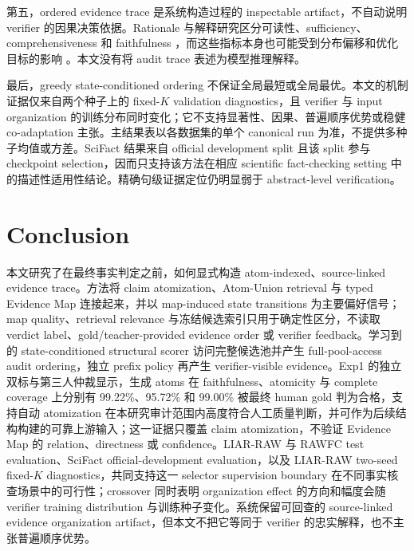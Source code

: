\documentclass[letterpaper]{article}
\begin{document}
第五，ordered evidence trace 是系统构造过程的 inspectable artifact，不自动说明 verifier 的因果决策依据。Rationale 与解释研究区分可读性、sufficiency、comprehensiveness 和 faithfulness \citep{Lei2016Rationalizing,DeYoung2020ERASER,Jacovi2020Faithfulness}，而这些指标本身也可能受到分布偏移和优化目标的影响 \citep{Hsia2024Goodhart}。本文没有将 audit trace 表述为模型推理解释。

最后，greedy state-conditioned ordering 不保证全局最短或全局最优。本文的机制证据仅来自两个种子上的 fixed-$K$ validation diagnostics，且 verifier 与 input organization 的训练分布同时变化；它不支持显著性、因果、普遍顺序优势或稳健 co-adaptation 主张。主结果表以各数据集的单个 canonical run 为准，不提供多种子均值或方差。SciFact 结果来自 official development split 且该 split 参与 checkpoint selection，因而只支持该方法在相应 scientific fact-checking setting 中的描述性适用性结论。精确句级证据定位仍明显弱于 abstract-level verification。

\section{Conclusion}

本文研究了在最终事实判定之前，如何显式构造 atom-indexed、source-linked evidence trace。方法将 claim atomization、Atom-Union retrieval 与 typed Evidence Map 连接起来，并以 map-induced state transitions 为主要偏好信号；map quality、retrieval relevance 与冻结候选索引只用于确定性区分，不读取 verdict label、gold/teacher-provided evidence order 或 verifier feedback。学习到的 state-conditioned structural scorer 访问完整候选池并产生 full-pool-access audit ordering，独立 prefix policy 再产生 verifier-visible evidence。Exp1 的独立双标与第三人仲裁显示，生成 atoms 在 faithfulness、atomicity 与 complete coverage 上分别有 99.22\%、95.72\% 和 99.00\% 被最终 human gold 判为合格，支持自动 atomization 在本研究审计范围内高度符合人工质量判断，并可作为后续结构构建的可靠上游输入；这一证据只覆盖 claim atomization，不验证 Evidence Map 的 relation、directness 或 confidence。LIAR-RAW 与 RAWFC test evaluation、SciFact official-development evaluation，以及 LIAR-RAW two-seed fixed-$K$ diagnostics，共同支持这一 selector supervision boundary 在不同事实核查场景中的可行性；crossover 同时表明 organization effect 的方向和幅度会随 verifier training distribution 与训练种子变化。系统保留可回查的 source-linked evidence organization artifact，但本文不把它等同于 verifier 的忠实解释，也不主张普遍顺序优势。


\end{document}
